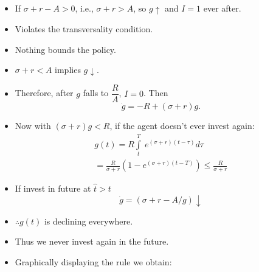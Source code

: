 \documentclass[12pt,compress,handout]{beamer}  %
\begin{document}
\begin{frame}
\begin{itemize}[<+->]
\item If $\sigma +r-A>0$, i.e., $\sigma +r>A$, so $g \uparrow$ and $I=1$
    ever after.
\\[2mm]
\item Violates the transversality condition.
\medskip
\item Nothing bounds the policy.
\\[2mm]

\item $\sigma +r<A$ implies $g \downarrow $.

\item Therefore, after $g$ falls to $\dfrac{R}{A}$, $I = 0$. Then
\begin{equation*}
\dot{g}=-R+(\sigma +r)g.
\end{equation*}
\end{itemize}
\end{frame}


\begin{frame}
\begin{itemize}[<+->]
\item Now with $(\sigma +r)g<R$, if the agent doesn't ever invest again:
\begin{multline*}
g(t)=R\int\limits_t^T\ e^{(\sigma +r)(t-\tau )}d\tau \\
=\frac{R}{\sigma +r}(1-e^{(\sigma +r)(t-T)})\leq \frac{R}{\sigma +r}
\end{multline*}
\item If invest in future at $\hat{t} > t$
\begin{equation*}
\dot{g}= (\sigma +r-A/g)\downarrow
\end{equation*}
\item $\therefore g(t)$ is declining everywhere.
\item Thus we never invest again in the future.
\item Graphically displaying the rule we obtain:
\end{itemize}
\end{frame}
\end{document}
